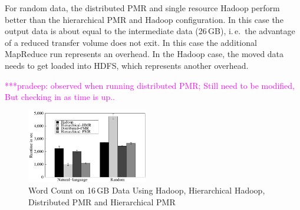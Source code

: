 \documentclass{acm_proc_article-sp}
\newcommand{\pnote}[1]{ {\textcolor{magenta} { ***pradeep: #1 }}}
\newcommand{\pnote}[1]{}
\begin{document}
For random data, the distributed PMR and single resource Hadoop perform better
than the hierarchical PMR and Hadoop configuration. In this case the output data
is about equal to the intermediate data (26\,GB), i.\,e.\ the advantage of a
reduced transfer volume does not exit. In this case the additional MapReduce run
represents an overhead. In the Hadoop case, the moved data needs to get loaded 
into HDFS, which represents another overhead.






\pnote{observed when running distributed PMR; Still need to be modified, But 
checking in as time is up..}


\begin{figure}[ht]
	\centering
		\includegraphics[width=0.47\textwidth]{figures/allmrs_rands.pdf}
\caption{Word Count on 16\,GB Data Using Hadoop, Hierarchical Hadoop, Distributed PMR  and 	Hierarchical PMR} 	
\label{fig:allmrs_rands}
\end{figure}		
\end{document}
